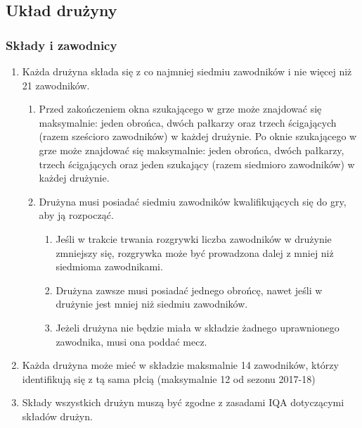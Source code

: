 \documentclass[12pt]{article}
\begin{document}
\subsection{Układ drużyny}

\subsubsection{Składy i zawodnicy}

\begin{enumerate}
	\item
	      Każda drużyna składa się z co najmniej siedmiu zawodników i nie więcej
	      niż 21 zawodników.

	      \begin{enumerate}
		      \item
		            Przed zakończeniem okna szukającego w grze może znajdować się
		            maksymalnie: jeden obrońca, dwóch pałkarzy oraz trzech ścigających
		            (razem sześcioro zawodników) w każdej drużynie. Po oknie szukającego
		            w grze może znajdować się maksymalnie: jeden obrońca, dwóch
		            pałkarzy, trzech ścigających oraz jeden szukający (razem siedmioro
		            zawodników) w każdej drużynie.
		      \item
		            Drużyna musi posiadać siedmiu zawodników kwalifikujących się do gry,
		            aby ją rozpocząć.

		            \begin{enumerate}
			            \item
			                  Jeśli w trakcie trwania rozgrywki liczba zawodników w drużynie
			                  zmniejszy się, rozgrywka może być prowadzona dalej z mniej niż
			                  siedmioma zawodnikami.
			            \item
			                  Drużyna zawsze musi posiadać jednego obrońcę, nawet jeśli w
			                  drużynie jest mniej niż siedmiu zawodników.
			            \item
			                  Jeżeli drużyna nie będzie miała w składzie żadnego uprawnionego
			                  zawodnika, musi ona poddać mecz.
		            \end{enumerate}
	      \end{enumerate}
	\item
	      Każda drużyna może mieć w składzie maksmalnie 14 zawodników, którzy
	      identifikują się z tą sama płcią (maksymalnie 12 od sezonu 2017-18)
	\item
	      Składy wszystkich drużyn muszą być zgodne z zasadami IQA dotyczącymi
	      składów drużyn.
\end{enumerate}
\end{document}
